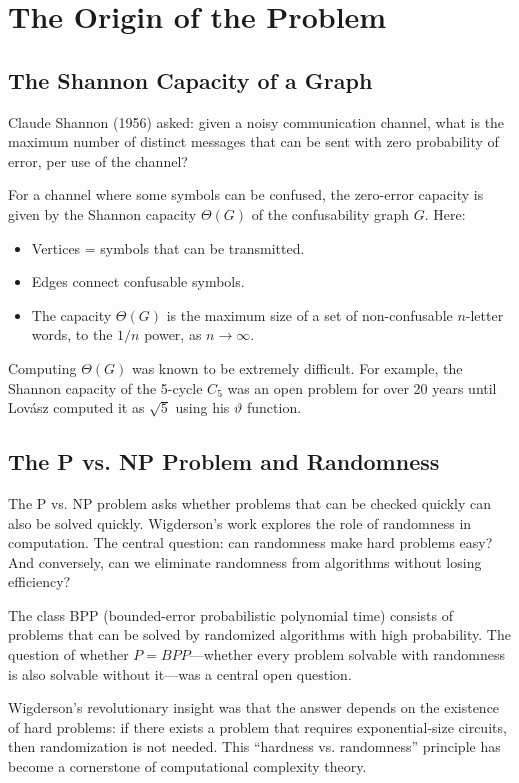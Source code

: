 \section{The Origin of the Problem}

\subsection{The Shannon Capacity of a Graph}

Claude Shannon (1956) asked: given a noisy communication channel, what is the maximum number of distinct messages that can be sent with zero probability of error, per use of the channel?

For a channel where some symbols can be confused, the zero-error capacity is given by the Shannon capacity $\Theta(G)$ of the confusability graph $G$. Here:
\begin{itemize}
\item Vertices = symbols that can be transmitted.
\item Edges connect confusable symbols.
\item The capacity $\Theta(G)$ is the maximum size of a set of non-confusable $n$-letter words, to the $1/n$ power, as $n \to \infty$.
\end{itemize}

Computing $\Theta(G)$ was known to be extremely difficult. For example, the Shannon capacity of the 5-cycle $C_5$ was an open problem for over 20 years until Lov\'asz computed it as $\sqrt{5}$ using his $\vartheta$ function.

\subsection{The P vs. NP Problem and Randomness}

The P vs. NP problem asks whether problems that can be checked quickly can also be solved quickly. Wigderson's work explores the role of randomness in computation. The central question: can randomness make hard problems easy? And conversely, can we eliminate randomness from algorithms without losing efficiency?

The class BPP (bounded-error probabilistic polynomial time) consists of problems that can be solved by randomized algorithms with high probability. The question of whether $P = BPP$---whether every problem solvable with randomness is also solvable without it---was a central open question.

Wigderson's revolutionary insight was that the answer depends on the existence of hard problems: if there exists a problem that requires exponential-size circuits, then randomization is not needed. This ``hardness vs. randomness'' principle has become a cornerstone of computational complexity theory.

